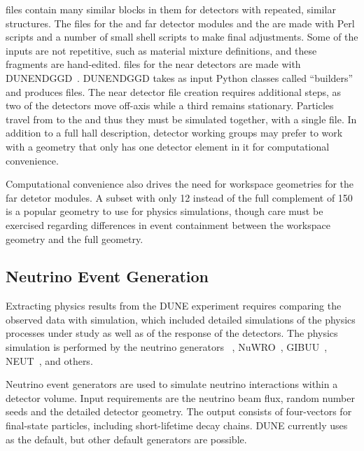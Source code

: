 \documentclass[../main-v1.tex]{subfiles}
\begin{document}
  files contain many similar blocks in them for detectors with repeated, similar structures.  The   files for the %
 and  far detector modules and the  are made with Perl scripts and a number of small shell scripts to make final adjustments.  Some of the inputs are not repetitive, such as material mixture definitions, and these fragments are hand-edited.    files for the near detectors are made with DUNENDGGD~\cite{ref:ggd}.  DUNENDGGD takes as input Python classes called ``builders'' 
and produces   files.  The near detector   file creation requires additional steps, as two of the detectors move off-axis while a third remains stationary.  Particles travel from  to the  and thus they must be simulated together, with a single   file.  In addition to a full hall description, detector working groups may prefer to work with a geometry that only has one detector element in it for computational convenience.

Computational convenience also drives the need for workspace geometries for the far detetor modules.  A subset with only 12  instead of the full complement of 150 is a popular geometry to use for physics simulations, though care must be exercised regarding differences in event containment between the workspace geometry and the full geometry.

\subsection{Neutrino Event Generation}

Extracting physics results from the DUNE experiment requires comparing the observed data with simulation, 
which included detailed simulations 
of the physics processes under study as well as of the response of the detectors.  The physics simulation is performed by the neutrino generators ~\cite{Andreopoulos:2009rq}, NuWRO~\cite{NuWro2012}, GIBUU~\cite{Gallmeister:2016dnq}, NEUT~\cite{Hayato:2009zz}, and others. 

Neutrino event generators are used to simulate neutrino interactions within a detector volume.  Input requirements are the neutrino beam flux, random number seeds and the detailed detector geometry. The output consists of four-vectors for final-state particles, including short-lifetime decay chains.  DUNE currently uses ~\cite{GENIE} as the default, but other default generators are possible. 
\end{document}
